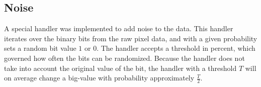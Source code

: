 \subsection{Noise}
A special handler was implemented to add noise to the data. This handler iterates over the binary bits from the raw pixel data, and with a given probability sets a random bit value \(1\) or \(0\). The handler accepts a threshold in percent, which governed how often the bits can be randomized. Because the handler does not take into account the original value of the bit, the handler with a threshold \(T\) will on average change a big-value with probability approximately \(\frac{T}{2}\).